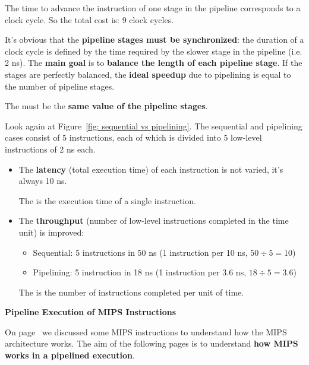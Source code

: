 \newpage

\noindent
The time to advance the instruction of one stage in the pipeline corresponds to a clock cycle. So the total cost is: 9 clock cycles.

\highspace
It's obvious that the \textbf{pipeline stages must be synchronized}: the duration of a clock cycle is defined by the time required by the slower stage in the pipeline (i.e. 2 ns). The \textbf{main goal} is to \textbf{balance the length of each pipeline stage}. If the stages are perfectly balanced, the \textbf{ideal speedup} due to pipelining is equal to the number of pipeline stages.

\begin{definitionbox}
    The  must be the \textbf{same value of the pipeline stages}.
\end{definitionbox}

\highspace
Look again at Figure~\ref{fig: sequential vs pipelining}. The sequential and pipelining cases consist of 5 instructions, each of which is divided into 5 low-level instructions of 2 ns each.
\begin{itemize}
    \item The \textbf{latency} (total execution time) of each instruction is not varied, it's always 10 ns.
    \begin{definitionbox}[: latency]
        The  is the execution time of a single instruction.
    \end{definitionbox}

    \item The \textbf{throughput} (number of low-level instructions completed in the time unit) is improved:
    \begin{itemize}
        \item Sequential: 5 instructions in 50 ns (1 instruction per 10 ns, $50 \div 5 = 10$)
        \item Pipelining: 5 instruction in 18 ns (1 instruction per 3.6 ns, $18 \div 5 = 3.6$)
    \end{itemize}
    \begin{definitionbox}[: throughput]
        The  is the number of instructions completed per unit of time.
    \end{definitionbox}
\end{itemize}

\newpage

\begin{center}
    \large
    \textcolor{Red3}{\textbf{Pipeline Execution of MIPS Instructions}}
\end{center}
On page~\pageref{Execution (EX) details} we discussed some MIPS instructions to understand how the MIPS architecture works. The aim of the following pages is to understand \textbf{how MIPS works in a pipelined execution}.

